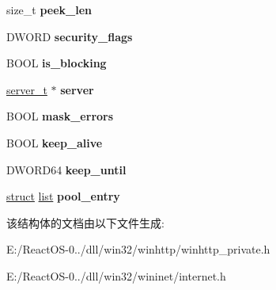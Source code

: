 \begin{DoxyCompactItemize}
\mbox{\label{structnetconn__t_aadb2697d62d6d8a98a83e172b9ea756f}} 
size\+\_\+t {\bfseries peek\+\_\+len}
\item 
\mbox{\label{structnetconn__t_ac666f2df0bb0d3a954caf2d1678ce140}} 
D\+W\+O\+RD {\bfseries security\+\_\+flags}
\item 
\mbox{\label{structnetconn__t_a00bfd13cbdc8dd11c2214bd1a544cdb0}} 
B\+O\+OL {\bfseries is\+\_\+blocking}
\item 
\mbox{\label{structnetconn__t_aee0b4f94d714b29de45c8a9e9fb0ac73}} 
\hyperlink{structserver__t}{server\+\_\+t} $\ast$ {\bfseries server}
\item 
\mbox{\label{structnetconn__t_aee6c5095b2c721f716facfa8e65e44bb}} 
B\+O\+OL {\bfseries mask\+\_\+errors}
\item 
\mbox{\label{structnetconn__t_acd7cd73864ee39818c5e5b6b60fc19b1}} 
B\+O\+OL {\bfseries keep\+\_\+alive}
\item 
\mbox{\label{structnetconn__t_acb8eac28649c868a52aae66bd0fec42d}} 
D\+W\+O\+R\+D64 {\bfseries keep\+\_\+until}
\item 
\mbox{\label{structnetconn__t_af9c558d783d7c21298f52e72f0d1c37b}} 
\hyperlink{interfacestruct}{struct} \hyperlink{classlist}{list} {\bfseries pool\+\_\+entry}
\end{DoxyCompactItemize}


该结构体的文档由以下文件生成\+:\begin{DoxyCompactItemize}
\item 
E\+:/\+React\+O\+S-\/0../dll/win32/winhttp/winhttp\+\_\+private.\+h\item 
E\+:/\+React\+O\+S-\/0../dll/win32/wininet/internet.\+h\end{DoxyCompactItemize}

